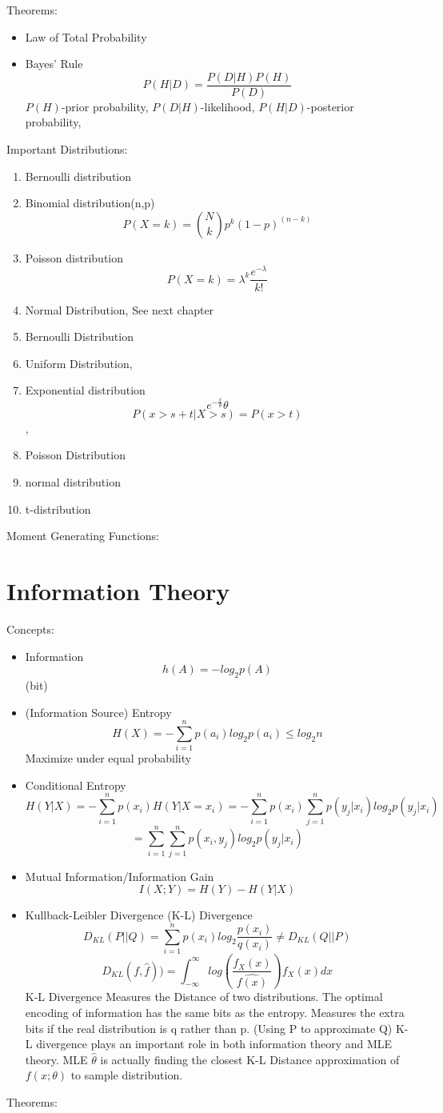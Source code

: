 \documentclass[11pt, openany]{book}              %
\begin{document}
Theorems:

\begin{itemize}
    \item Law of Total Probability
    \item Bayes' Rule $$P(H|D) = \frac{P(D|H) P(H)}{P(D)}$$ $P(H)$-prior probability, $P(D|H)$-likelihood, $P(H|D)$-posterior probability,
\end{itemize}

Important Distributions: 

\begin{enumerate}
	\item Bernoulli distribution
	\item Binomial distribution(n,p)$$P(X=k) = {N\choose k} p^k (1-p)^{(n-k)}$$
	\item Poisson distribution $$P(X=k) = \lambda^k \frac{e^{-\lambda}}{k!}$$
	\item Normal Distribution, See next chapter
	\item Bernoulli Distribution 
	\item Uniform Distribution,
	\item Exponential distribution $$e^{-\frac{x}{\theta}}\theta$$ $$P(x>s+t|X>s) = P(x>t)$$, 
	\item Poisson Distribution
	\item normal distribution
	\item t-distribution	
\end{enumerate} 

Moment Generating Functions:

\section{Information Theory}

Concepts:

\begin{itemize}
    \item Information $$h(A) = -log_2 p(A)$$ (bit)
    \item (Information Source) Entropy $$ H(X) = -\sum_{i=1}^n p(a_i)log_2p(a_i) \leq log_2 n$$ Maximize under equal probability
    \item Conditional Entropy $$H(Y|X)  = -\sum_{i=1}^n p(x_i)H(Y|X=x_i)= -\sum_{i=1}^n p(x_i)\sum_{j=1}^n p(y_j|x_i) log_2p(y_j|x_i) $$ $$ = \sum_{i=1}^n \sum_{j=1}^n p(x_i,y_j) log_2p(y_j|x_i) $$
    \item Mutual Information/Information Gain $$I(X;Y) = H(Y) - H(Y|X)$$
    \item Kullback-Leibler Divergence (K-L) Divergence 
      $$D_{KL}(P||Q) = \sum_{i=1}^n p(x_i) log_2\frac{p(x_i)}{q(x_i)} \neq D_{KL}(Q||P)$$
      $$D_{KL}(f,\hat{f})) = \int_{-\infty}^{\infty} log(\frac{f_X(x)}{\hat{f(x)}})f_X(x)dx $$
     K-L Divergence Measures the Distance of two distributions. The optimal encoding of information has the same bits as the entropy. Measures the extra bits if the real distribution is q rather than p. (Using P to approximate Q) K-L divergence plays an important role in both information theory and MLE theory. MLE $\hat{\theta}$ is actually finding the closest K-L Distance approximation of $f(x;\theta)$ to sample distribution.
\end{itemize}
Theorems:
\end{document}
